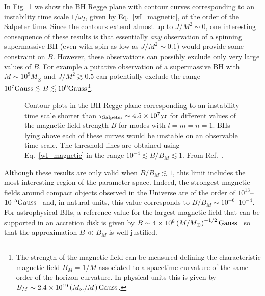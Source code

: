 \documentclass[11pt]{article}
\numberwithin{equation}{section} %
\begin{document}
In Fig.~\ref{fig:Regge_magnetic} we show the BH Regge plane with contour curves corresponding to an instability time scale $1/\omega_I$, given by Eq.~\eqref{wI_magnetic}, of the order of the Salpeter time. %
%
Since the contours extend almost up to $J/M^2\sim 0$, one interesting consequence of these results is that essentially \emph{any} observation of a spinning supermassive BH (even with spin as low as $J/M^2\sim 0.1$) would provide some constraint on $B$. However, these observations can possibly exclude only very large values of $B$. For example a putative observation of a supermassive BH with $M\sim 10^9 M_\odot$ and $J/M^2\gtrsim 0.5$ can potentially exclude the range $10^7 {\rm Gauss}\lesssim B\lesssim 10^9 {\rm Gauss}$\footnote{The strength of the magnetic field can be measured defining the characteristic magnetic field $B_M=1/M$ associated to a spacetime curvature of the same order of the horizon curvature. In physical units this is given by $B_M\sim 2.4\times 10^{19} \left(M_{\odot}/M\right) {\rm Gauss}$.}.
%

%
\begin{figure}[t]
\begin{center}
\caption{Contour plots in the BH Regge plane corresponding to an instability time scale shorter than $\tau_{\rm Salpeter}\sim 4.5\times 10^7{\rm yr}$ for different values of the magnetic field strength $B$ for modes with $l=m=n=1$. BHs lying above each of these curves would be unstable on an observable time scale. The threshold lines are obtained using Eq.~\eqref{wI_magnetic} in the range $10^{-4}\lesssim B/B_M\lesssim 1$. From Ref.~\cite{Brito:2014nja}.
\label{fig:Regge_magnetic}}
\end{center}
\end{figure}
%

Although these results are only valid when $B/B_M\lesssim 1$, this limit includes the most interesting region of the parameter space. Indeed, the strongest magnetic fields around compact objects observed in the Universe are of the order of $10^{13}$--$10^{15} {\rm Gauss}$~\cite{McGill} and, in natural units, this value corresponds to $B/B_M\sim 10^{-6}$--$10^{-4}$. For astrophysical BHs, a reference value for the largest magnetic field that can be supported in an accretion disk is given by $B\sim 4\times 10^8 \left(M/M_\odot\right)^{-1/2}{\rm Gauss}$~\cite{ReesAGN} so that the approximation $B\ll B_M$ is well justified.
\end{document}
